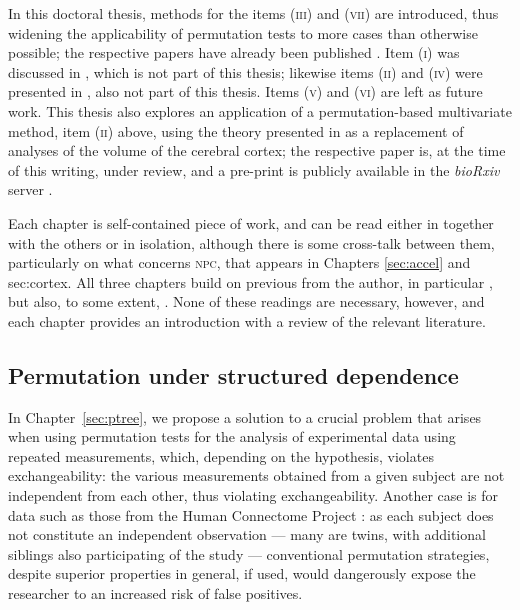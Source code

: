 In this doctoral thesis, methods for the items (\textsc{iii}) and (\textsc{vii}) are introduced, thus widening the applicability of permutation tests to more cases than otherwise possible; the respective papers have already been published \citep{Winkler2015, Winkler2016_fast}. Item (\textsc{i}) was discussed in \citet{Winkler2014}, which is not part of this thesis; likewise items (\textsc{ii}) and (\textsc{iv}) were presented in \citet{Winkler2016_npc}, also not part of this thesis. Items (\textsc{v}) and (\textsc{vi}) are left as future work. This thesis also explores an application of a permutation-based multivariate method, item (\textsc{ii}) above, using the theory presented in \citep{Winkler2016_npc} as a replacement of analyses of the volume of the cerebral cortex; the respective paper is, at the time of this writing, under review, and a pre-print is publicly available in the \emph{bioRxiv} server \citep{Winkler2016_joint}.

Each chapter is self-contained piece of work, and can be read either in together with the others or in isolation, although there is some cross-talk between them, particularly on what concerns \textsc{npc}, that appears in Chapters \ref{sec:accel} and {sec:cortex}. All three chapters build on previous from the author, in particular \citep{Winkler2014, Winkler2016_npc}, but also, to some extent, \citep{Winkler2010, Winkler2012}. None of these readings are necessary, however, and each chapter provides an introduction with a review of the relevant literature.

\subsection{Permutation under structured dependence}

In Chapter~\ref{sec:ptree}, we propose a solution to a crucial problem that arises when using permutation tests for the analysis of experimental data using repeated measurements, which, depending on the hypothesis, violates exchangeability: the various measurements obtained from a given subject are not independent from each other, thus violating exchangeability. Another case is for data such as those from the Human Connectome Project \citep[\textsc{hcp};][]{VanEssen2012,VanEssen2013}: as each subject does not constitute an independent observation --- many are twins, with additional siblings also participating of the study --- conventional permutation strategies, despite superior properties in general, if used, would dangerously expose the researcher to an increased risk of false positives.

